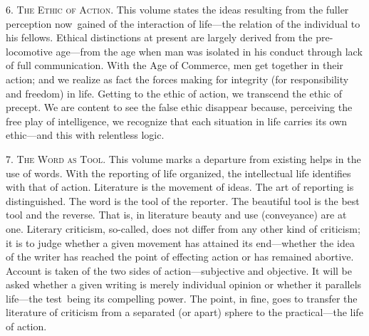 \documentclass[openany,nobib]{tufte-book}
\begin{document}
\vspace{0.05in}

6. \textsc{The Ethic of Action}. This volume states the ideas resulting from the
fuller perception now~gained of the interaction of life---the relation
of the individual to his fellows. Ethical distinctions at present are
largely derived from the pre-locomotive age---from the age when man was
isolated in his conduct through lack of full communication. With the Age
of Commerce, men get together in their action; and we realize as fact
the forces making for integrity (for responsibility and freedom) in
life. Getting to the ethic of action, we transcend the ethic of precept.
We are content to see the false ethic disappear because, perceiving the
free play of intelligence, we recognize that each situation in life
carries its own ethic---and this with relentless logic.~

\vspace{0.05in}

7. \textsc{The Word as Tool}. This volume marks a departure from existing helps
in the use of words. With the reporting of life organized, the
intellectual life identifies with that of action. Literature is the
movement of ideas. The art of reporting is distinguished. The word is
the tool of the reporter. The beautiful tool is the best tool and the
reverse. That is, in literature beauty and use (conveyance) are at one.
Literary criticism, so-called, does not differ from any other kind of
criticism; it is to judge whether a given movement has attained its
end---whether the idea of the writer has reached the point of effecting
action or has remained abortive. Account is taken of the two sides of
action---subjective and objective. It will be asked whether a given
writing is merely individual opinion or whether it parallels life---the
test~being its compelling power. The point, in fine, goes to transfer
the literature of criticism from a separated (or apart) sphere to the
practical---the life of action.~

\vspace{0.05in}
\end{document}
